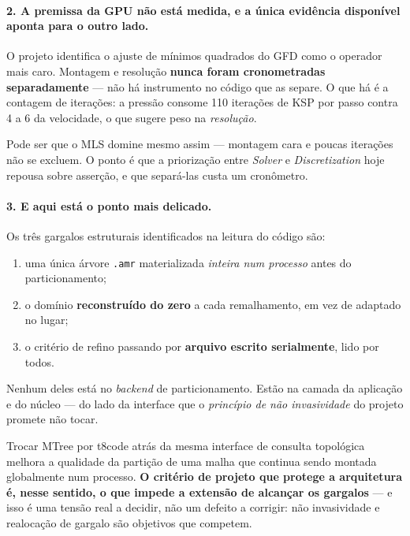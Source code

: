 \paragraph{2. A premissa da GPU n\~ao est\'a medida, e a \'unica evid\^encia
dispon\'ivel aponta para o outro lado.} O projeto identifica o ajuste de m\'inimos
quadrados do GFD como o operador mais caro. Montagem e resolu\c{c}\~ao
\textbf{nunca foram cronometradas separadamente} --- n\~ao h\'a instrumento no
c\'odigo que as separe. O que h\'a \'e a contagem de itera\c{c}\~oes: a press\~ao
consome 110 itera\c{c}\~oes de KSP por passo contra 4 a 6 da velocidade, o que
sugere peso na \emph{resolu\c{c}\~ao}.

Pode ser que o MLS domine mesmo assim --- montagem cara e poucas
itera\c{c}\~oes n\~ao se excluem. O ponto \'e que a prioriza\c{c}\~ao entre
\emph{Solver} e \emph{Discretization} hoje repousa sobre asser\c{c}\~ao, e que
separ\'a-las custa um cron\^ometro.

\paragraph{3. E aqui est\'a o ponto mais delicado.} Os tr\^es gargalos
estruturais identificados na leitura do c\'odigo s\~ao:

\begin{enumerate}
  \item uma \'unica \'arvore \texttt{.amr} materializada \emph{inteira num
    processo} antes do particionamento;
  \item o dom\'inio \textbf{reconstru\'ido do zero} a cada remalhamento, em vez de
    adaptado no lugar;
  \item o crit\'erio de refino passando por \textbf{arquivo escrito
    serialmente}, lido por todos.
\end{enumerate}

Nenhum deles est\'a no \emph{backend} de particionamento. Est\~ao na camada da
aplica\c{c}\~ao e do n\'ucleo --- do lado da interface que o \emph{princ\'ipio de
n\~ao invasividade} do projeto promete n\~ao tocar.

Trocar MTree por t8code atr\'as da mesma interface de consulta topol\'ogica
melhora a qualidade da parti\c{c}\~ao de uma malha que continua sendo montada
globalmente num processo. \textbf{O crit\'erio de projeto que protege a
arquitetura \'e, nesse sentido, o que impede a extens\~ao de alcan\c{c}ar os
gargalos} --- e isso \'e uma tens\~ao real a decidir, n\~ao um defeito a corrigir:
n\~ao invasividade e realoca\c{c}\~ao de gargalo s\~ao objetivos que competem.

